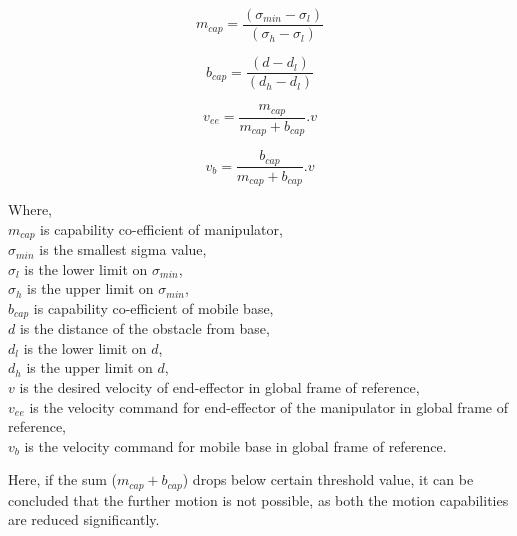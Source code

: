 \begin{equation}
m_{cap} = \frac{(\sigma_{min} - \sigma_{l})}{(\sigma_{h} - \sigma_{l})}
\end{equation}


\begin{equation}
b_{cap} = \frac{(d - d_{l})}{(d_{h} - d_{l})}
\end{equation}


\begin{equation}
v_{ee} = \frac{m_{cap}}{m_{cap} + b_{cap}}.v
\end{equation} 

\begin{equation}
v_{b} = \frac{b_{cap}}{m_{cap} + b_{cap}}.v
\end{equation} 

Where, \\
$m_{cap}$ is capability co-efficient of manipulator, \\
$\sigma_{min}$ is the smallest sigma value, \\
$\sigma_{l}$ is the lower limit on $\sigma_{min}$, \\
$\sigma_{h}$ is the upper limit on $\sigma_{min}$, \\
$b_{cap}$ is capability co-efficient of mobile base, \\
$d$ is the distance of the obstacle from base, \\
$d_{l}$ is the lower limit on $d$, \\
$d_{h}$ is the upper limit on $d$, \\
$v$ is the desired velocity of end-effector in global frame of reference, \\ 
$v_{ee}$ is the velocity command for end-effector of the manipulator in global frame of reference, \\
$v_{b}$ is the velocity command for mobile base in global frame of reference.

Here, if the sum ($m_{cap} + b_{cap}$) drops below certain threshold value, it can be concluded that the further motion is not possible, as both the motion capabilities are reduced significantly. 